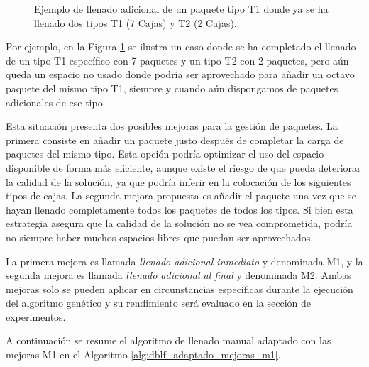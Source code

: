\documentclass[openany]{article}
\begin{document}
\begin{figure}[H]
    \centering
    
    \caption{Ejemplo de llenado adicional de un paquete tipo T1 donde ya se ha llenado dos tipos T1 (7 Cajas) y T2 (2 Cajas).}
    \label{fig:llenado_adicional}
\end{figure}

Por ejemplo, en la Figura \ref{fig:llenado_adicional} se ilustra un caso donde se ha completado el llenado de un tipo T1 específico con 7 paquetes y un tipo T2 con 2 paquetes, pero aún queda un espacio no usado donde podría ser aprovechado para añadir un octavo paquete del mismo tipo T1, siempre y cuando aún dispongamos de paquetes adicionales de ese tipo.

Esta situación presenta dos posibles mejoras para la gestión de paquetes. La primera consiste en añadir un paquete justo después de completar la carga de paquetes del mismo tipo. Esta opción podría optimizar el uso del espacio disponible de forma más eficiente, aunque existe el riesgo de que pueda deteriorar la calidad de la solución, ya que podría inferir en la colocación de los siguientes tipos de cajas. La segunda mejora propuesta es añadir el paquete una vez que se hayan llenado completamente todos los paquetes de todos los tipos. Si bien esta estrategia asegura que la calidad de la solución no se vea comprometida, podría no siempre haber muchos espacios libres que puedan ser aprovechados.

La primera mejora es llamada \textit{llenado adicional inmediato} y denominada M1, y la segunda mejora es llamada \textit{llenado adicional al final} y denominada  M2. Ambas mejoras solo se pueden aplicar en circunstancias específicas durante la ejecución del algoritmo genético y su rendimiento será evaluado en la sección de experimentos.

A continuación se resume el algoritmo de llenado manual adaptado con las mejoras M1 en el Algoritmo \ref{alg:dblf_adaptado_mejoras_m1}.
\end{document}
